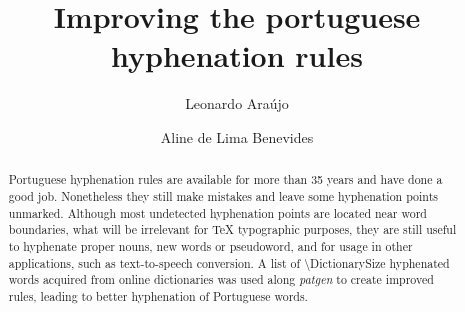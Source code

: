 \documentclass{article}
\title{Improving the portuguese hyphenation rules}
\author{Leonardo Araújo \and Aline de Lima Benevides}
\begin{document}
\VerbatimFootnotes %
\maketitle



\begin{abstract}
    Portuguese hyphenation rules are available for more than 35
    years and have done a good job. Nonetheless they still make mistakes and
    leave some hyphenation points unmarked. Although most undetected
    hyphenation points are located near word boundaries, what will be
    irrelevant for \TeX{} typographic purposes, they are still useful to
    hyphenate proper nouns, new words or pseudoword, and for usage in other
    applications, such as text-to-speech conversion. A list of
    \num{\DictionarySize} hyphenated words acquired from online dictionaries was
    used along \emph{patgen} to create improved rules, leading to better hyphenation
    of Portuguese words.
\end{abstract}



















\end{document}
